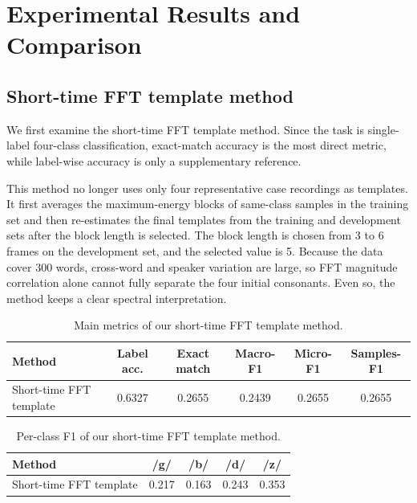 \section{Experimental Results and Comparison}

\subsection{Short-time FFT template method}

We first examine the short-time FFT template method. Since the task is single-label four-class classification, exact-match accuracy is the most direct metric, while label-wise accuracy is only a supplementary reference.

This method no longer uses only four representative case recordings as templates. It first averages the maximum-energy blocks of same-class samples in the training set and then re-estimates the final templates from the training and development sets after the block length is selected. The block length is chosen from 3 to 6 frames on the development set, and the selected value is 5. Because the data cover 300 words, cross-word and speaker variation are large, so FFT magnitude correlation alone cannot fully separate the four initial consonants. Even so, the method keeps a clear spectral interpretation.

\begin{table}[H]
    \centering
    \caption{Main metrics of our short-time FFT template method.}
    \label{tab:strict-main}
    \begin{tabular}{lccccc}
        \toprule
        Method & Label acc. & Exact match & Macro-F1 & Micro-F1 & Samples-F1 \\
        \midrule
        Short-time FFT template & 0.6327 & 0.2655 & 0.2439 & 0.2655 & 0.2655 \\
        \bottomrule
    \end{tabular}
\end{table}

\begin{table}[H]
    \centering
    \caption{Per-class F1 of our short-time FFT template method.}
    \label{tab:strict-per-label}
    \begin{tabular}{lcccc}
        \toprule
        Method & /g/ & /b/ & /d/ & /z/ \\
        \midrule
        Short-time FFT template & 0.217 & 0.163 & 0.243 & 0.353 \\
        \bottomrule
    \end{tabular}
\end{table}


